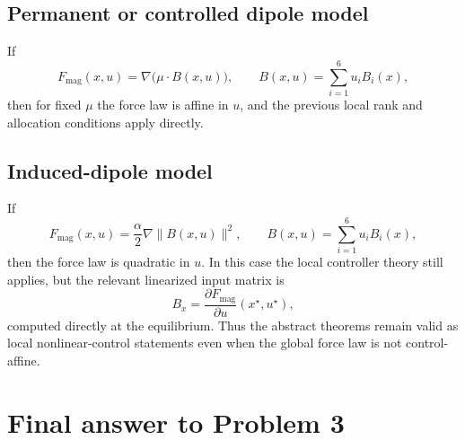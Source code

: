 \documentclass[11pt]{article}
\theoremstyle{definition}
\begin{document}
\subsection*{Permanent or controlled dipole model}
If
\[
F_{\mathrm{mag}}(x,u) = \nabla\bigl(\mu \cdot B(x,u)\bigr),
\qquad
B(x,u)=\sum_{i=1}^6 u_i B_i(x),
\]
then for fixed $\mu$ the force law is affine in $u$, and the previous local rank and allocation conditions apply directly.

\subsection*{Induced-dipole model}
If
\[
F_{\mathrm{mag}}(x,u) = \frac{\alpha}{2}\nabla \|B(x,u)\|^2,
\qquad
B(x,u)=\sum_{i=1}^6 u_i B_i(x),
\]
then the force law is quadratic in $u$. In this case the local controller theory still applies, but the relevant linearized input matrix is
\[
B_x = \frac{\partial F_{\mathrm{mag}}}{\partial u}(x^\star,u^\star),
\]
computed directly at the equilibrium. Thus the abstract theorems remain valid as local nonlinear-control statements even when the global force law is not control-affine.

\section{Final answer to Problem 3}
\end{document}
